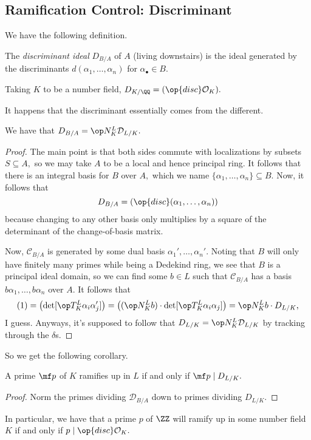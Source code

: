 \documentclass[../notes.tex]{subfiles}
\begin{document}
\subsection{Ramification Control: Discriminant}
We have the following definition.
\begin{definition}
	The \textit{discriminant ideal} $D_{B/A}$ of $A$ (living downstairs) is the ideal generated by the discriminants $d(\alpha_1,\ldots,\alpha_n)$ for $\alpha_\bullet\in B.$
\end{definition}
\begin{example}
	Taking $K$ to be a number field, $D_{K/\QQ}=(\op{disc}\mathcal O_K).$
\end{example}
It happens that the discriminant essentially comes from the different.
\begin{proposition}
	We have that $D_{B/A}=\op N^L_K\mathcal D_{L/K}.$
\end{proposition}
\begin{proof}
	The main point is that both sides commute with localizations by subsets $S\subseteq A,$ so we may take $A$ to be a local and hence principal ring. It follows that there is an integral basis for $B$ over $A,$ which we name $\{\alpha_1,\ldots,\alpha_n\}\subseteq B.$ Now, it follows that
	\[D_{B/A}=(\op{disc}(\alpha_1,\ldots,\alpha_n))\]
	because changing to any other basis only multiplies by a square of the determinant of the change-of-basis matrix.

	Now, $\mathcal C_{B/A}$ is generated by some dual basis $\alpha_1',\ldots,\alpha_n'.$ Noting that $B$ will only have finitely many primes while being a Dedekind ring, we see that $B$ is a principal ideal domain, so we can find some $b\in L$ such that $\mathcal C_{B/A}$ has a basis $b\alpha_1,\ldots,b\alpha_n$ over $A.$\todo{} It follows that
	\[(1)=\left(\det[\op T^L_K\alpha_i\alpha_j']\right)=\left((\op N^L_Kb)\cdot\det[\op T^L_K\alpha_i\alpha_j]\right)=\op N^L_Kb\cdot D_{L/K},\]
	I guess. Anyways, it's supposed to follow that $D_{L/K}=\op N^L_K\mathcal D_{L/K}$ by tracking through the $\delta$s.
\end{proof}
So we get the following corollary.
\begin{proposition}
	A prime $\mf p$ of $K$ ramifies up in $L$ if and only if $\mf p\mid D_{L/K}.$
\end{proposition}
\begin{proof}
	Norm the primes dividing $\mathcal D_{B/A}$ down to primes dividing $D_{L/K}.$
\end{proof}
In particular, we have that a prime $p$ of $\ZZ$ will ramify up in some number field $K$ if and only if $p\mid\op{disc}\mathcal O_K.$
\end{document}
